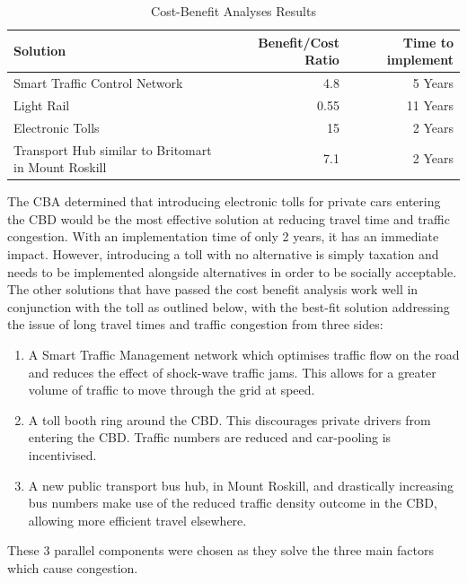 \documentclass[twoside, a4paper, 11pt]{article}
\begin{document}
\begin{table}[H]
\centering
\begin{tabular}{|l|r|r|}
\hline
Solution                                            & Benefit/Cost Ratio & Time to implement \\ \hline
Smart Traffic Control Network                       & 4.8                & 5 Years           \\
Light Rail                                          & 0.55               & 11 Years          \\
Electronic Tolls                                    & 15                 & 2 Years           \\
Transport Hub similar to Britomart in Mount Roskill & 7.1                & 2 Years\\          
\hline
\end{tabular}
\caption{Cost-Benefit Analyses Results}
\label{cbares}
\end{table}

The CBA determined that introducing electronic tolls for private cars entering the CBD would be the most effective solution at reducing travel time and traffic congestion. With an implementation time of only 2 years, it has an immediate impact. However, introducing a toll with no alternative is simply taxation and needs to be implemented alongside alternatives in order to be socially acceptable. The other solutions that have passed the cost benefit analysis work well in conjunction with the toll as outlined below, with the best-fit solution addressing the issue of long travel times and traffic congestion from three sides:

\begin{enumerate}
\item A Smart Traffic Management network which optimises traffic flow on the road and reduces the effect of shock-wave traffic jams. This allows for a greater volume of traffic to move through the grid at speed.
\item A toll booth ring around the CBD. This discourages private drivers from entering the CBD. Traffic numbers are reduced and car-pooling is incentivised.
\item A new public transport bus hub, in Mount Roskill, and drastically increasing bus numbers make use of the reduced traffic density outcome in the CBD, allowing more efficient travel elsewhere.
\end{enumerate}

These 3 parallel components were chosen as they solve the three main factors which cause congestion.
\end{document}
